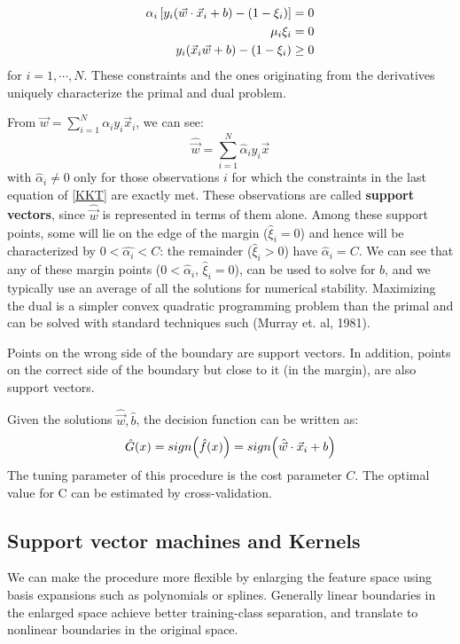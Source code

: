 \documentclass[12pt, letterpaper]{article}
\theoremstyle{definition}
\DeclarePairedDelimiter\autobracket{(}{)}
\newcommand{\br}[1]{\autobracket*{#1}}
\begin{document}
\begin{equation}
\begin{aligned}
\alpha_i \left[ y_i\br{\vec{w}\cdot\vec{x}_i+b}-\br{1-\xi_i}\right] &=0\\
\mu_i \xi_i &= 0\\
y_i(\vec{x}_i\vec{w}+b) - (1 - \xi_i) &\ge 0
\end{aligned}
\label{KKT}
\end{equation}
for $i=1,\cdots, N$. These constraints and the ones originating from the derivatives uniquely characterize the primal and dual problem.

From $\vec{w} = \sum_{i=1}^N  \alpha_i y_i \vec{x}_i$, we can see:
\begin{equation}
\hat{\vec{w}} = \sum_{i=1}^N \hat{\alpha}_i y_i \vec{x}
\end{equation}
with $\hat{\alpha}_i \ne 0$ only for those observations $i$ for which the constraints in the last equation of \ref{KKT} are exactly met. These observations are called \textbf{support vectors}, since $\hat{\vec{w}}$ is represented in terms of them alone. Among these support points, some will lie on the edge of the margin ($\hat{\xi}_i=0$) and hence will be characterized by $0 < \hat{\alpha_i} <C$: the remainder ($\hat{\xi}_i>0$) have $\hat{\alpha}_i=C$. We can see that any of these margin points ($0<\hat{\alpha}_i$, $\hat{\xi}_i = 0$), can be used to solve for $b$, and we typically use an average of all the solutions for numerical stability. Maximizing the dual is a simpler convex quadratic programming problem than the primal and can be solved with standard techniques such (Murray et. al, 1981).

Points on the wrong side of the boundary are support vectors. In addition, points on the correct side of the boundary but close to it (in the margin), are also support vectors. 

Given the solutions $\hat{\vec{w}}, \hat{b}$, the decision function can be written as:
\begin{equation}
\hat{G} (x) = sign \br{\hat{f}(x)}= sign\br{\hat{\vec{w}}\cdot \vec{x}_i+b}
\end{equation}
The tuning parameter of this procedure is the cost parameter $C$. The optimal value for C can be estimated by cross-validation.
\subsection{Support vector machines and Kernels}
We can make the procedure more flexible by enlarging the feature space using basis expansions such as polynomials or splines. Generally linear boundaries in the enlarged space achieve better training-class separation, and translate to nonlinear boundaries in the original space. 
\end{document}
